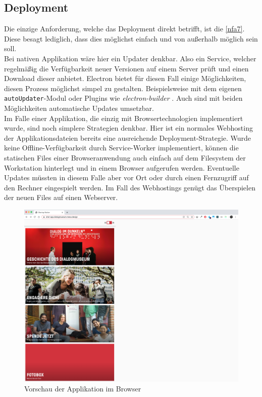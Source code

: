 \subsection{Deployment}
\label{subs:deployment}

Die einzige Anforderung, welche das Deployment direkt betrifft, ist die 
\ref{nfa7}. Diese besagt lediglich, dass dies möglichst einfach und von außerhalb möglich
sein soll.\\
Bei nativen Applikation wäre hier ein Updater denkbar. Also ein Service,
welcher regelmäßig die Verfügbarkeit neuer Versionen auf einem Server prüft und einen Download 
dieser anbietet. Electron bietet für diesen Fall einige Möglichkeiten, diesen Prozess 
möglichst simpel zu gestalten. Beispielsweise mit dem eigenen 
\texttt{autoUpdater}-Modul \cite{electron-autoUpdater} oder Plugins wie 
\emph{electron-builder} \cite{electron-builder}. Auch sind mit beiden Möglichkeiten
automatische Updates umsetzbar.\\
Im Falle einer Applikation, die einzig mit Browsertechnologien implementiert wurde, sind 
noch simplere Strategien denkbar. Hier ist ein normales Webhosting der Applikationsdateien 
bereits eine ausreichende Deployment-Strategie. Wurde keine Offline-Verfügbarkeit durch
Service-Worker implementiert, können die statischen Files einer Browseranwendung
auch einfach auf dem Filesystem der Workstation hinterlegt und in einem Browser aufgerufen 
werden. Eventuelle Updates müssten in diesem Falle aber vor Ort oder durch einen
Fernzugriff auf den Rechner eingespielt werden. Im Fall des Webhostings genügt das Überspielen
der neuen Files auf einen Webserver.\\

\begin{figure}
    \centering
    \includegraphics[width=1\textwidth]{figures/images/browser-preview.png}
    \caption{Vorschau der \shst{} Applikation im Browser}
    \label{fig:browser-preview}
\end{figure}


